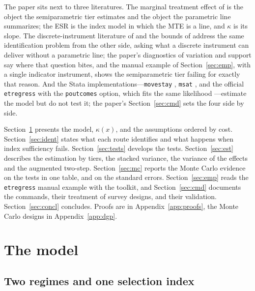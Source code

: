 \documentclass[11pt,a4paper]{article}
\theoremstyle{plain}
\theoremstyle{definition}
\theoremstyle{remark}
\newcommand{\1}{\mathbf{1}}
\newcommand{\cmd}[1]{\texttt{#1}}
\begin{document}
The paper sits next to three literatures. The marginal treatment effect
of \citet{heckman2005} is the object the semiparametric tier estimates
and the object the parametric line summarizes; the ESR is the index
model in which the MTE is a line, and $\kappa$ is its slope. The
discrete-instrument literature of \citet{brinch2017} and the bounds of
\citet{mogstad2018} address the same identification problem from the
other side, asking what a discrete instrument can deliver without a
parametric line; the paper's diagnostics of variation and support say
where that question bites, and the manual example of
Section~\ref{sec:emp}, with a single indicator instrument, shows the
semiparametric tier failing for exactly that reason. And the Stata
implementations---\cmd{movestay} \citep{lokshin2004}, \cmd{msat}
\citep{araar2026msat}, and the official \cmd{etregress} with the
\cmd{poutcomes} option, which fits the same likelihood
\citep{statacorp2025}---estimate the model but do not test it; the paper's
Section~\ref{sec:cmd} sets the four side by side.

Section~\ref{sec:model} presents the model, $\kappa(x)$, and the
assumptions ordered by cost. Section~\ref{sec:ident} states what each
route identifies and what happens when index sufficiency fails.
Section~\ref{sec:tests} develops the tests. Section~\ref{sec:est}
describes the estimation by tiers, the stacked variance, the variance
of the effects and the augmented two-step. Section~\ref{sec:mc} reports
the Monte Carlo evidence on the tests in one table, and on the standard
errors.
Section~\ref{sec:emp} reads the \cmd{etregress} manual example with the
toolkit, and Section~\ref{sec:cmd} documents the commands, their
treatment of survey designs, and their validation.
Section~\ref{sec:concl} concludes. Proofs are in
Appendix~\ref{app:proofs}, the Monte Carlo designs in
Appendix~\ref{app:dgp}.

\section{The model}\label{sec:model}

\subsection{Two regimes and one selection index}\label{sec:model:base}
\end{document}

